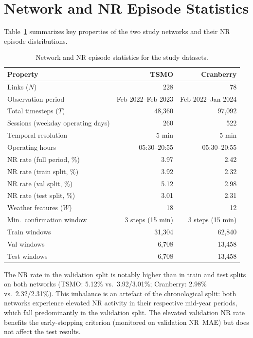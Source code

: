 \documentclass[a4paper]{cas-sc}
\begin{document}
\section{Network and NR Episode Statistics}
\label{app:data_stats}

Table~\ref{tab:network_stats} summarizes key properties of the two
study networks and their NR episode distributions.

\begin{table}[h]
\centering
\caption{Network and NR episode statistics for the study datasets.}
\label{tab:network_stats}
\small
\begin{tabular}{lrr}
\toprule
Property & TSMO & Cranberry \\
\midrule
Links ($N$)                          & 228 & 78 \\
Observation period                   & Feb 2022--Feb 2023 & Feb 2022--Jan 2024 \\
Total timesteps ($T$)                & 48,360 & 97,092 \\
Sessions (weekday operating days)    & 260 & 522 \\
Temporal resolution                  & 5 min & 5 min \\
Operating hours                      & 05:30--20:55 & 05:30--20:55 \\
\midrule
NR rate (full period, \%)            & 3.97 & 2.42 \\
NR rate (train split, \%)            & 3.92 & 2.32 \\
NR rate (val split, \%)              & 5.12 & 2.98 \\
NR rate (test split, \%)             & 3.01 & 2.31 \\
\midrule
Weather features ($W$)               & 18 & 12 \\
Min.\ confirmation window            & 3 steps (15 min) & 3 steps (15 min) \\
\midrule
Train windows                        & 31,304 & 62,840 \\
Val windows                          & 6,708 & 13,458 \\
Test windows                         & 6,708 & 13,458 \\
\bottomrule
\end{tabular}
\end{table}

The NR rate in the validation split is notably higher than in train
and test splits on both networks (TSMO: 5.12\% vs.\ 3.92/3.01\%;
Cranberry: 2.98\% vs.\ 2.32/2.31\%).
This imbalance is an artefact of the chronological split: both
networks experience elevated NR activity in their respective
mid-year periods, which fall predominantly in the validation split.
The elevated validation NR rate benefits the early-stopping criterion
(monitored on validation NR~MAE) but does not affect the test results.
\end{document}
